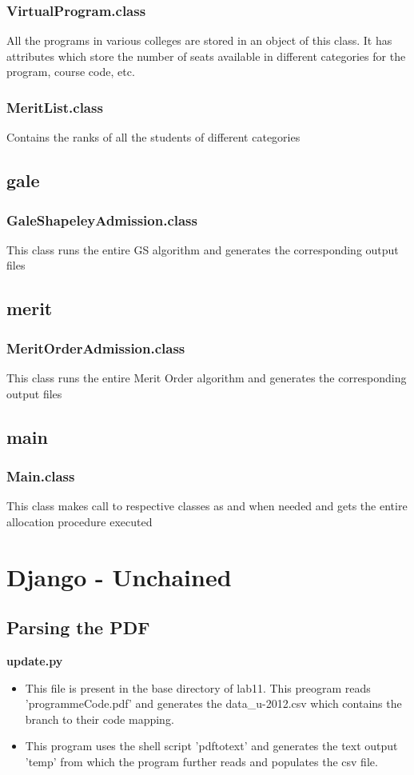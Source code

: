 \documentclass[]{report}
\begin{document}
\subsection{VirtualProgram.class}
All the programs in various colleges are stored in an object of this class. It has attributes which store the number of seats available in different categories for the program, course code, etc.

\subsection{MeritList.class}
Contains the ranks of all the students of different categories

\section{gale}
\subsection{GaleShapeleyAdmission.class}
This class runs the entire GS algorithm and generates the corresponding output files

\section{merit}
\subsection{MeritOrderAdmission.class}
This class runs the entire Merit Order algorithm and generates the corresponding output files

\section{main}
\subsection{Main.class}
This class makes call to respective classes as and when needed and gets the entire allocation procedure executed

\chapter{Django - Unchained}
\section{Parsing the PDF}
\textbf{update.py}
\begin{itemize}
\item This file is present in the base directory of lab11. This preogram reads 'programmeCode.pdf' and generates the data\_u-2012.csv which contains the branch to their code mapping.
\item This program uses the shell script 'pdftotext' and generates the text output 'temp' from which the program further reads and populates the csv file.
\end{itemize}
\end{document}

